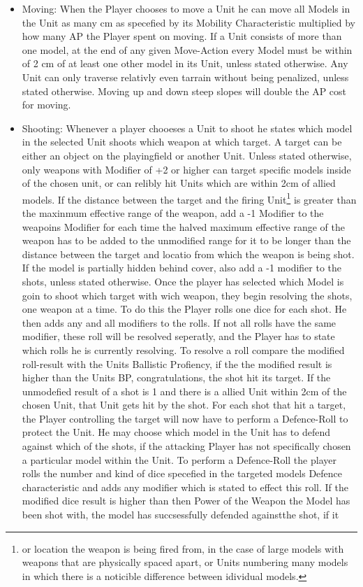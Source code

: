 \documentclass[a4paper,12pt]{book}
\begin{document}
\begin{adjustwidth}{-2cm}{-2cm}
\begin{multicols}{2}
\begin{itemize}

	\item Moving: When the Player chooses to move a Unit he can move all Models in the Unit as many cm as specefied by its Mobility Characteristic multiplied by how many AP the Player spent on moving. If a Unit consists of more than one model, at the end of any given Move-Action every Model must be within of 2 cm of at least one other model in its Unit, unless stated otherwise. Any Unit can only traverse relativly even tarrain without being penalized, unless stated otherwise. Moving up and down steep slopes will double the AP cost for moving.
	\item Shooting: Whenever a player chooeses a Unit to shoot he states which model in the selected Unit shoots which weapon at which target. A target can be either an object on the playingfield or another Unit. Unless stated otherwise, only weapons with Modifier of +2 or higher can target specific models inside of the chosen unit, or can relibly hit Units which are within 2cm of allied models. If the distance between the target and the firing Unit\footnote{or location the weapon is being fired from, in the case of large models with weapons that are physically spaced apart, or Units numbering many models in which there is a noticible difference between idividual models.} is greater than the maxinmum effective range of the weapon, add a -1 Modifier to the weapoins Modifier for each time the halved maximum effective range of the weapon has to be added to the unmodified range for it to be longer than the distance between the target and locatio from which the weapon is being shot. If the model is partially hidden behind cover, also add a -1 modifier to the shots, unless stated otherwise. Once the player has selected which Model is goin to shoot which target with wich weapon, they begin resolving the shots, one weapon at a time. To do this the Player rolls one dice for each shot. He then adds any and all modifiers to the rolls. If not all rolls have the same modifier, these roll will be resolved seperatly, and the Player has to state which rolls he is currently resolving. To resolve a roll compare the modified roll-result with the Units Ballistic Profiency, if the the modified result is higher than the Units BP, congratulations, the shot hit its target. If the unmodefied result of a shot is 1 and there is a allied Unit within 2cm of the chosen Unit, that Unit gets hit by the shot. For each shot that hit a target, the Player controlling the target will now have to perform a Defence-Roll to protect the Unit. He may choose which model in the Unit has to defend against which of the shots, if the attacking Player has not specifically chosen a particular model within the Unit. To perform a Defence-Roll the player rolls the number and kind of dice specefied in the targeted models Defence characteristic and adds any modifier which is stated to effect this roll. If the modified dice result is higher than then Power of the Weapon the Model has been shot with, the model has succsessfully defended againstthe  shot, if it 
\end{itemize}
\end{multicols}
\end{adjustwidth}
\end{document}
